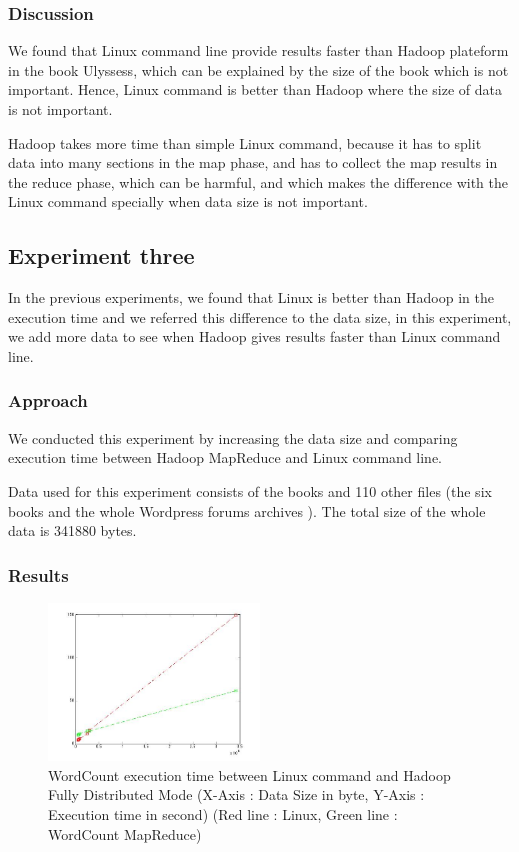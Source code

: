 \documentclass[10pt, conference]{IEEEtran}
\begin{document}
\subsubsection{Discussion}
We found that Linux command line provide results faster than Hadoop plateform in the book Ulyssess, which can be explained by the size of the book which is not important. Hence, Linux command is better than Hadoop where the size of data is not important. 

Hadoop takes more time than simple Linux command, because it has to split data into many sections in the map phase, and has to collect the map results in the reduce phase, which can be harmful, and which makes the difference with the Linux command specially when data size is not important.

\subsection{Experiment three}
In the previous experiments, we found that Linux is better than Hadoop in the execution time and we referred this difference to the data size, in this experiment, we add more data to see when Hadoop gives results faster than Linux command line.
\subsubsection{Approach}
We conducted this experiment by increasing the data size and comparing execution time between Hadoop MapReduce and Linux command line.

Data used for this experiment consists of the books \cite{book0} \cite{book1} \cite{book2} \cite{book3} \cite{book4} \cite{book5} and 110 other files (the six books and the whole Wordpress forums archives \cite{WPArchives}). The total size of the whole data is 341880 bytes.

\subsubsection{Results}

\begin{figure}
	\includegraphics[width=0.5\textwidth]{plots/experiment3.jpg}
	\caption{\label{ResultExperiment3} WordCount execution time between Linux command and Hadoop Fully Distributed Mode (X-Axis : Data Size in byte, Y-Axis : Execution time in second) (Red line : Linux, Green line : WordCount MapReduce)}
\end{figure}
\end{document}
